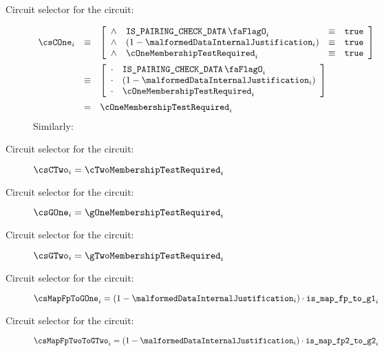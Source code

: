 \begin{description}
    
    \item[Circuit selector for the  circuit:]
        \[
            \begin{array}{lcl}
                \csCOne_{i} & \equiv &
                \left[ \begin{array}{clcr}
                    \wedge & \isBlsPairingCheckData_{i}        & \equiv & \texttt{true} \\
                    \wedge & (1 - \malformedDataInternalJustification_{i})   & \equiv & \texttt{true} \\
                    \wedge & \cOneMembershipTestRequired_{i} & \equiv & \texttt{true} \\
                \end{array} \right] \vspace{2mm} \\
                & \equiv & 
                \left[ \begin{array}{clcr}
                    \cdot & \isBlsPairingCheckData_{i}        \\
                    \cdot & (1 - \malformedDataInternalJustification_{i})   \\
                    \cdot & \cOneMembershipTestRequired_{i} \\
                \end{array} \right] \vspace{2mm} \\
                & =      & \cOneMembershipTestRequired_{i} \\
            \end{array}
        \]
    \noindent
    Similarly:
    \item[Circuit selector for the  circuit:]
        $\csCTwo_{i} = \cTwoMembershipTestRequired_{i}$
    \item[Circuit selector for the  circuit:]
        $\csGOne_{i} = \gOneMembershipTestRequired_{i}$
    \item[Circuit selector for the  circuit:]
        $\csGTwo_{i} = \gTwoMembershipTestRequired_{i}$
    \item[Circuit selector for the  circuit:]
        $\csMapFpToGOne_{i} = (1 - \malformedDataInternalJustification_{i}) \cdot \locIsBlsMapFpToGOne_{i}$
    \item[Circuit selector for the  circuit:]
        $\csMapFpTwoToGTwo_{i} = (1 - \malformedDataInternalJustification_{i}) \cdot \locIsBlsMapFpTwoToGTwo_{i}$
\end{description}    

